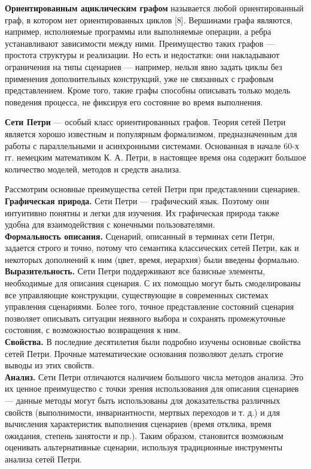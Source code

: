 \documentclass[a4paper,14pt]{article}
\begin{document}
\textbf{Ориентированным ациклическим графом}  называется любой ориентированный граф, в котором нет ориентированных циклов [8]. Вершинами графа являются, например, исполняемые программы или выполняемые операции, а ребра устанавливают зависимости между ними.
Преимущество таких графов — простота структуры и реализации. Но есть
и недостатки: они накладывают ограничения на типы сценариев — например, нельзя явно задать циклы без применения дополнительных конструкций, уже не связанных с графовым представлением. Кроме того, такие графы способны описывать только модель поведения процесса, не фиксируя его состояние во время выполнения.

\textbf{Сети Петри}  — особый класс ориентированных графов. Теория сетей Петри является хорошо известным и популярным формализмом, предназначенным для работы с параллельными и асинхронными системами. Основанная в начале 60-х гг. немецким математиком К. А. Петри, в настоящее время она содержит большое количество моделей, методов и средств анализа.

Рассмотрим основные преимущества сетей Петри при представлении
сценариев.\\
\textbf{Графическая природа.} Сети Петри — графический язык. Поэтому они
интуитивно понятны и легки для изучения. Их графическая природа
также удобна для взаимодействия с конечными пользователями.\\ \textbf{Формальность описания.} Сценарий, описанный в терминах сети Петри, задается строго и точно, потому что семантика классических сетей Петри,
как и некоторых дополнений к ним (цвет, время, иерархия) были введены
формально.\\
\textbf{Выразительность.} Сети Петри поддерживают все базисные элементы, необходимые для описания сценария. С их помощью могут быть смоделированы все управляющие конструкции, существующие в современных системах управления сценариями. Более того, точное представление состояний
сценария позволяет описывать ситуации неявного выбора и сохранять
промежуточные состояния, с возможностью возвращения к ним.\\
\textbf{Свойства.} В последние десятилетия были подробно изучены основные
свойства сетей Петри. Прочные математические основания позволяют
делать строгие выводы из этих свойств.\\
\textbf{Анализ.} Сети Петри отличаются наличием большого числа методов анализа. Это их ценное преимущество с точки зрения использования для
описания сценариев — данные методы могут быть использованы для доказательства различных свойств (выполнимости, инвариантности, мертвых
переходов и т. д.) и для вычисления характеристик выполнения сценариев (время отклика, время ожидания, степень занятости и пр.). Таким образом,
становится возможным оценивать альтернативные сценарии, используя
традиционные инструменты анализа сетей Петри.
\end{document}
